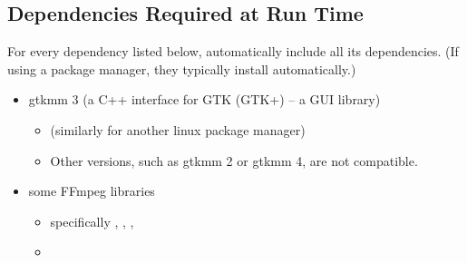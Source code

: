 \documentclass[11pt,a4paper,twoside,openright]{report}
\begin{document}
\subsection{Dependencies Required at Run Time}\label{sec:runtimedeps}
For every dependency listed below, automatically include all its dependencies. (If using a package manager, they typically install automatically.)
\begin{itemize}
	\item gtkmm 3 (a C++ interface for GTK (GTK+) -- a GUI library)
		\begin{itemize}
			\item \pubinst{} (similarly for another linux package manager)
			\item Other versions, such as gtkmm 2 or gtkmm 4, are not compatible.
		\end{itemize}
	\item some FFmpeg libraries
		\begin{itemize}
			\item specifically , , , 
			\item \pubinst
		\end{itemize}
\end{itemize}
\end{document}
